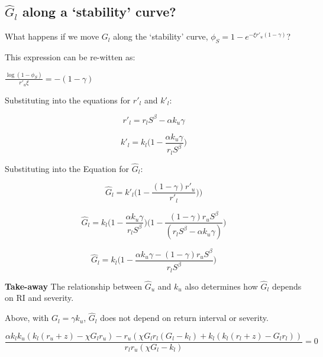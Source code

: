 \documentclass[12pt]{article}
\begin{document}
  \subsection*{$\hat G_l$ along a `stability' curve?}
  
What happens if we move  $G_l$ along the `stability' curve, $\phi_S = 1- e^{-\xi r'_u (1-\gamma)}$?

This expression can be re-witten as: 

 $\frac{\log(1 - \phi_S)}{  r'_u \xi  }= -  (1 - \gamma )$
 
 
 Substituting into the equations for $r'_l$ and $k'_l$:

\begin{equation}
r'_l= r_l S^\beta   - \alpha k_u \gamma
\end{equation}


\begin{equation}
 k'_l  = k_l  \bigg(1  - \frac{\alpha k_u \gamma} { r_l S^\beta}\bigg)
\end{equation}   


Substituting into the Equation for $\hat G_l$:

\begin{equation}
\hat{G}_l =
 		k'_l \big( 1 - \frac{(1 - \gamma) r'_u }{r'_l }  ) \big)
\end{equation}



\begin{equation}
\hat{G}_l =
 		  k_l  \bigg(1  - \frac{\alpha k_u \gamma} { r_l S^\beta}\bigg) 
		  \bigg( 1 - \frac{(1 - \gamma) r_u  S^\beta }{(r_l S^\beta   - \alpha k_u \gamma)}   \bigg)
\end{equation}


\begin{equation}
\hat{G}_l =
 		  {k_l}
		  \bigg( 1 - \frac{\alpha k_u \gamma - (1 - \gamma) r_u  S^\beta}{r_l S^\beta }  \bigg)
\end{equation}


\textbf{Take-away}
 The relationship between $\hat G_u$ and $k_u$ also determines how $\hat G_l$ depends on RI and severity.
 
Above, with $G_l= \gamma k_u$,  $\hat{G}_l$ does not depend on return interval or severity.

$$
\frac{\alpha  {k_l} {k_u} ({k_l} ({r_u}+z)-\chi 
   {G_l} {r_u})-{r_u} (\chi  {G_l} {r_l}
   ({G_l}-{k_l})+{k_l} ({k_l}
   ({r_l}+z)-{G_l} {r_l}))}{{r_l} {r_u} (\chi
    {G_l}-{k_l})} = 0
   $$
   
   
   
\end{document}
